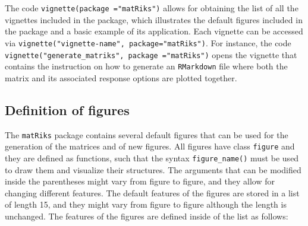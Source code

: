 The code \texttt{vignette(package\ ="matRiks")} allows for obtaining the list of all the vignettes included in the package, which illustrates the default figures included in the package and a basic example of its application.
Each vignette can be accessed via \texttt{vignette("vignette-name",\ package="matRiks")}.
For instance, the code \texttt{vignette("generate\_matriks",\ package\ ="matRiks")} opens the vignette that contains the instruction on how to generate an \texttt{RMarkdown} file where both the matrix and its associated response options are plotted together.

\subsection{Definition of figures}\label{definition-of-figures}

The \texttt{matRiks} package contains several default figures that can be used for the generation of the matrices and of new figures.
All figures have class \texttt{figure} and they are defined as functions, such that the syntax \texttt{figure\_name()} must be used to draw them and visualize their structures.
The arguments that can be modified inside the parentheses might vary from figure to figure, and they allow for changing different features.
The default features of the figures are stored in a list of length 15, and they might vary from figure to figure although the length is unchanged.
The features of the figures are defined inside of the list as follows:

